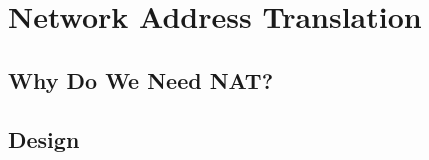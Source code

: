 \chapter{Network Address Translation}

\section{Why Do We Need NAT?}
 \label{network_address_translation:why_needed}

\section{Design}

